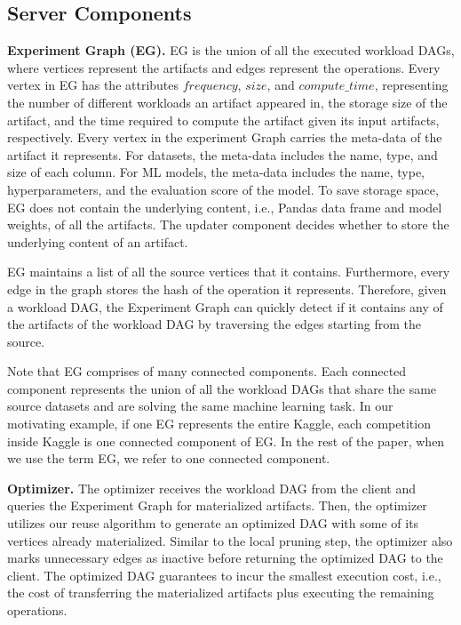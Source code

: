 \subsection{Server Components}
\textbf{Experiment Graph (EG).}
EG is the union of all the executed workload DAGs, where vertices represent the artifacts and edges represent the operations.
Every vertex in EG has the attributes $frequency$, $size$, and $compute\_time$, representing the number of different workloads an artifact appeared in, the storage size of the artifact, and the time required to compute the artifact given its input artifacts, respectively.
Every vertex in the experiment Graph carries the meta-data of the artifact it represents.
For datasets, the meta-data includes the name, type, and size of each column.
For ML models, the meta-data includes the name, type, hyperparameters, and the evaluation score of the model.
To save storage space, EG does not contain the underlying content, i.e., Pandas data frame and model weights, of all the artifacts.
The updater component decides whether to store the underlying content of an artifact.

EG maintains a list of all the source vertices that it contains.
Furthermore, every edge in the graph stores the hash of the operation it represents.
Therefore, given a workload DAG, the Experiment Graph can quickly detect if it contains any of the artifacts of the workload DAG by traversing the edges starting from the source.

Note that EG comprises of many connected components.
Each connected component represents the union of all the workload DAGs that share the same source datasets and are solving the same machine learning task.
In our motivating example, if one EG represents the entire Kaggle, each competition inside Kaggle is one connected component of EG.
In the rest of the paper, when we use the term EG, we refer to one connected component.

\textbf{Optimizer. }
The optimizer receives the workload DAG from the client and queries the Experiment Graph for materialized artifacts.
Then, the optimizer utilizes our reuse algorithm to generate an optimized DAG with some of its vertices already materialized.
Similar to the local pruning step, the optimizer also marks unnecessary edges as inactive before returning the optimized DAG to the client.
The optimized DAG guarantees to incur the smallest execution cost, i.e., the cost of transferring the materialized artifacts plus executing the remaining operations.

